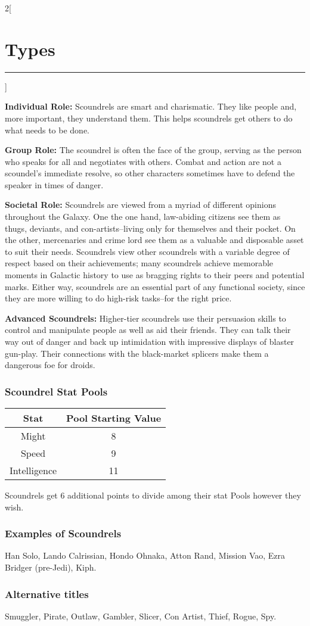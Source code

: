 \documentclass[a4paper,10pt,final]{book}
\newcommand{\HRule}{\rule{\linewidth}{0.5mm}} %
\newcommand{\newSection}[1]{\section*{#1} \addcontentsline{toc}{section}{#1} \label{sec:#1} \HRule}
\newcommand{\statPool}[5]
{
	\subsubsection*{#1 Stat Pools}
	\label{subsub:#1StatPools}
	\begin{center}
	\begin{tabular}{ |c|c| }
	\hline
	\textbf{Stat} & \textbf{Pool Starting Value} \\
	\hline \hline
	Might & #2 \\
	\hline
 	Speed & #3  \\
 	\hline
 	Intelligence & #4  \\
 	\hline
	\end{tabular}
	\end{center}
	#1s get #5 additional points to divide among their stat Pools however they wish.
}
\newcommand{\itemLine}[2]{\textbf{#1:} {#2}\par}
\newenvironment{docsection}[1]
{
  \begin{multicols*}{2}[\newSection{#1}]
}
{
  \end{multicols*}
  \newpage
}
\begin{document}
\begin{docsection}{Types}
\itemLine{Individual Role}{Scoundrels are smart and charismatic. They like people and, more important, they understand them. This helps scoundrels get others to do what needs
to be done.}

\itemLine{Group Role}{The scoundrel is often the face of the group, serving as the person who speaks for all and negotiates with others. Combat and action are not a scoundel’s immediate resolve, so other characters sometimes have to defend the speaker in times of danger.}

\itemLine{Societal Role}{Scoundrels are viewed from a myriad of different opinions throughout the Galaxy. One the one hand, law-abiding citizens see them as thugs, deviants, and con-artists--living only for themselves and their pocket. On the other, mercenaries and crime lord see them as a valuable and disposable asset to suit their needs. Scoundrels view other scoundrels with a variable degree of respect based on their achievements; many scoundrels achieve memorable moments in Galactic history to use as bragging rights to their peers and potential marks. Either way, scoundrels are an essential part of any functional society, since they are more willing to do high-risk tasks--for the right price.}

\itemLine{Advanced Scoundrels}{Higher-tier scoundrels use their persuasion skills to control and manipulate people as well as aid their friends. They can talk their way out of danger and back up intimidation with impressive displays of blaster gun-play. Their connections with the black-market splicers make them a dangerous foe for droids.}

\statPool{Scoundrel}{8}{9}{11}{6}

\subsubsection*{Examples of Scoundrels}
\label{subsub:scoundrelExamples}

Han Solo, Lando Calrissian, Hondo Ohnaka, Atton Rand, Mission Vao, Ezra Bridger (pre-Jedi), Kiph.

\subsubsection*{Alternative titles}
\label{subsub:scoundrelAlternative}

Smuggler, Pirate, Outlaw, Gambler, Slicer, Con Artist, Thief, Rogue, Spy. 



\end{docsection}
\end{document}
